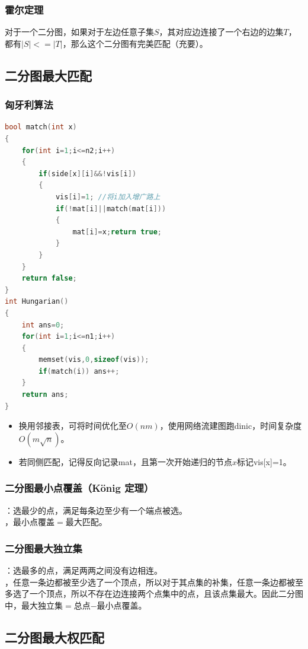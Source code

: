 \documentclass[a4paper]{book}
\begin{document}
\subsubsection{霍尔定理}
对于一个二分图，如果对于左边任意子集$S$，其对应边连接了一个右边的边集$T$，都有$|S|<=|T|$，那么这个二分图有完美匹配（充要）。
\subsection{二分图最大匹配}
\subsubsection{匈牙利算法}
\begin{lstlisting}[language=c++,title=邻接矩阵$O(n^3)$]
bool match(int x)
{
    for(int i=1;i<=n2;i++)
    {
        if(side[x][i]&&!vis[i])
        {
            vis[i]=1; //将i加入增广路上
            if(!mat[i]||match(mat[i])) 
            {
                mat[i]=x;return true;
            }
        }
    }
    return false;
}
int Hungarian()
{
    int ans=0;
    for(int i=1;i<=n1;i++)
    {
        memset(vis,0,sizeof(vis));
        if(match(i)) ans++;
    }
    return ans;
}
\end{lstlisting}
\begin{itemize}
    \item 换用邻接表，可将时间优化至$O(nm)$，使用网络流建图跑dinic，时间复杂度$O(m\sqrt n)$。
    \item 若同侧匹配，记得反向记录mat，且第一次开始递归的节点$x$标记vis[x]=1。
\end{itemize}
\subsubsection{二分图最小点覆盖（König 定理）}
：选最少的点，满足每条边至少有一个端点被选。\\
，最小点覆盖$=$最大匹配。
\subsubsection{二分图最大独立集}
：选最多的点，满足两两之间没有边相连。\\
，任意一条边都被至少选了一个顶点，所以对于其点集的补集，任意一条边都被至多选了一个顶点，所以不存在边连接两个点集中的点，且该点集最大。因此二分图中，最大独立集$=$总点$-$最小点覆盖。
\subsection{二分图最大权匹配}
\end{document}
